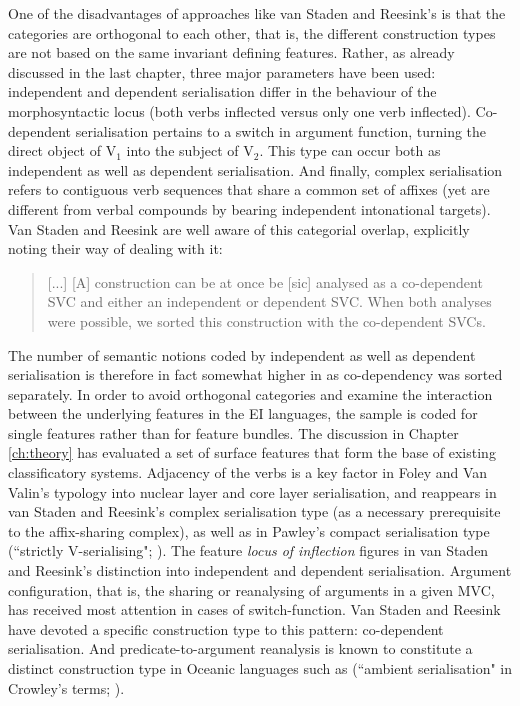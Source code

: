 \largerpage[-1]
One of the disadvantages of approaches like van Staden and Reesink's is that the categories are orthogonal to each other, that is, the different construction types are not based on the same invariant defining features. Rather, as already discussed in the last chapter, three major parameters have been used: independent and dependent serialisation differ in the behaviour of the morphosyntactic locus (both verbs inflected versus only one verb inflected). Co-dependent serialisation pertains to a switch in argument function, turning the direct object of V$_1$ into the subject of V$_2$. This type can occur both as independent as well as dependent serialisation. And finally, complex serialisation refers to contiguous verb sequences that share a common set of affixes (yet are different from verbal compounds by bearing independent intonational targets). Van Staden and Reesink are well aware of this categorial overlap, explicitly noting their way of dealing with it: 

\begin{quote}
[...] [A] construction can be at once be [sic] analysed as a co-dependent SVC and either an independent or dependent SVC. When both analyses were possible, we sorted this construction with the co-dependent SVCs. \citep[47]{vanstaden2008serial}
\end{quote}

The number of semantic notions coded by independent as well as dependent serialisation is therefore in fact somewhat higher in  as co-dependency was sorted separately. In order to avoid orthogonal categories and examine the interaction between the underlying features in the EI languages, the sample is coded for single features rather than for feature bundles. The discussion in Chapter \ref{ch:theory} has evaluated a set of surface features that form the base of existing classificatory systems. Adjacency of the verbs is a key factor in Foley and Van Valin's typology into nuclear layer and core layer serialisation, and reappears in van Staden and Reesink's complex serialisation type (as a necessary prerequisite to the affix-sharing complex), as well as in Pawley's compact serialisation type (``strictly V-serialising"; \citealt[172]{pawley2008serial}). The feature \textit{locus of inflection} figures in van Staden and Reesink's distinction into independent and dependent serialisation. Argument configuration, that is, the sharing or reanalysing of arguments in a given MVC, has received most attention in cases of switch-function. Van Staden and Reesink have devoted a specific construction type to this pattern: co-dependent serialisation. And predicate-to-argument reanalysis is known to constitute a distinct construction type in Oceanic languages such as  (``ambient serialisation" in Crowley's terms; \citealt{crowley2002serial}).

